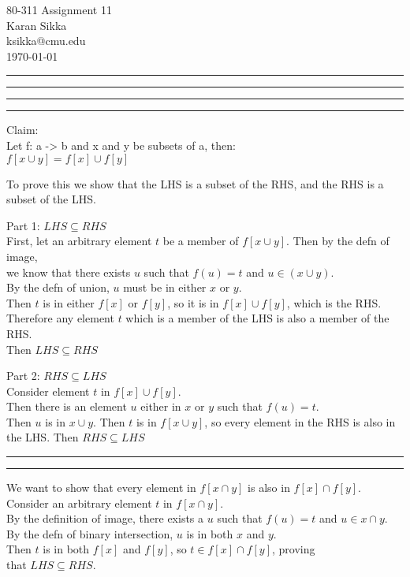 \documentclass[11pt,letterpaper]{article}
\makeatletter
\newcommand{\question}[1] {\vspace{.25in} \hrule\vspace{0.5em}
\noindent{\bf #1} \vspace{0.5em}
\hrule \vspace{.10in}}
\newcommand{\myname}{Karan Sikka}
\newcommand{\myandrew}{ksikka@cmu.edu}
\newcommand{\myhwnum}{11}
\makeatother
\begin{document}
\medskip

\thispagestyle{plain}
\begin{center}                  %
{\Large 80-311 Assignment \myhwnum} \\
\myname \\
\myandrew \\
\today
\end{center}

\question{1}


\question{2.i}
Claim:\\
Let f: a -> b and x and y be subsets of a, then:\\
$f[x \cup y] = f[x] \cup f[y]$

To prove this we show that the LHS is a subset of the RHS, and the RHS is a subset of the LHS.

Part 1: $LHS \subseteq RHS$\\
First, let an arbitrary element $t$ be a member of $f[x \cup y]$. Then by the defn of image,\\
we know that there exists $u$ such that $f(u) = t$ and $u \in (x \cup y)$.\\
By the defn of union, $u$ must be in either $x$ or $y$.\\
Then $t$ is in either $f[x]$ or $f[y]$, so it is in $f[x] \cup f[y]$, which is the RHS.\\
Therefore any element $t$ which is a member of the LHS is also a member of the RHS.\\
Then $LHS \subseteq RHS$

Part 2: $RHS \subseteq LHS$\\
Consider element $t$ in $f[x] \cup f[y]$.\\
Then there is an element $u$ either in $x$ or $y$ such that $f(u) = t$.\\
Then $u$ is in $x \cup y$. Then $t$ is in $f[x \cup y]$, so every element in the RHS is also in the LHS.
Then $RHS \subseteq LHS$

\question{2.ii}
We want to show that every element in $f[x \cap y]$ is also in $f[x] \cap f[y]$.\\
Consider an arbitrary element $t$ in $f[x \cap y]$.\\
By the definition of image, there exists a $u$ such that $f(u) = t$ and $u \in x \cap y$.\\
By the defn of binary intersection, $u$ is in both $x$ and $y$.\\
Then $t$ is in both $f[x]$ and $f[y]$, so $t \in f[x] \cap f[y]$, proving\\
that $LHS \subseteq RHS$.\\
\end{document}
